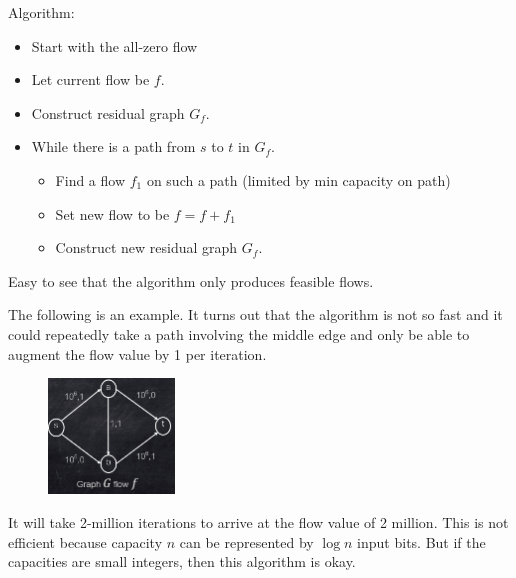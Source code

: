 Algorithm:
\begin{itemize}
	\item Start with the all-zero flow
	\item Let current flow be $f$.
	\item Construct residual graph $G_f$.
	\item While there is a path from $s$ to $t$ in $G_f$.
	\begin{itemize}
		\item Find a flow $f_1$ on such a path (limited by min capacity on path)\item Set new flow to be $f = f + f_1$
		\item Construct new residual graph $G_f$.
	\end{itemize}
\end{itemize}

Easy to see that the algorithm only produces feasible flows.

The following is an example. It turns out that the algorithm is not so fast and it could repeatedly take a path involving the middle edge and only be able to augment the flow value by 1 per iteration.
\begin{figure}[H]
	\centering
	\includegraphics[width=0.3\textwidth]{fig/runtime.png}
\end{figure}
It will take 2-million iterations to arrive at the flow value of 2 million. This is not efficient because capacity $n$ can be represented by $\log n$ input bits. But if the capacities are small integers, then this algorithm is okay.

